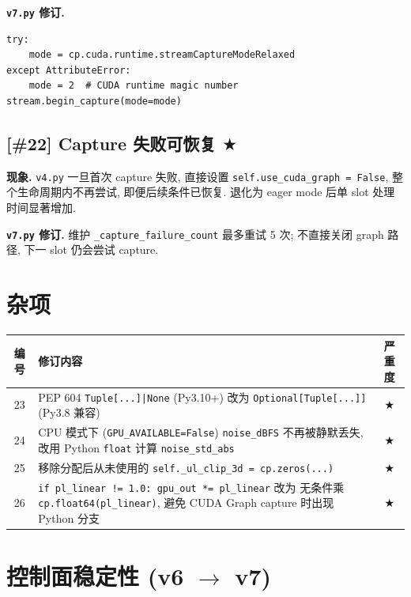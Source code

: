 \documentclass[11pt,a4paper,UTF8,fontset=fandol]{ctexart}
\newcommand{\sone}{\textcolor{starcolor}{$\bigstar$}}
\newcommand{\vfour}{\texttt{v4.py}}
\newcommand{\vseven}{\texttt{v7.py}}
\newcommand{\bugitem}[3]{%
  \subsection{[\##1] #2 \hfill #3}%
  \vspace{-0.5em}%
}
\begin{document}
\textbf{\vseven{} 修订.}
\begin{verbatim}
try:
    mode = cp.cuda.runtime.streamCaptureModeRelaxed
except AttributeError:
    mode = 2  # CUDA runtime magic number
stream.begin_capture(mode=mode)
\end{verbatim}

\bugitem{22}{Capture 失败可恢复}{\sone}

\textbf{现象.} \vfour{} 一旦首次 capture 失败, 直接设置
\texttt{self.use\_cuda\_graph = False}, 整个生命周期内不再尝试,
即便后续条件已恢复. 退化为 eager mode 后单 slot 处理时间显著增加.

\textbf{\vseven{} 修订.} 维护 \texttt{\_capture\_failure\_count}
最多重试 5 次; 不直接关闭 graph 路径, 下一 slot 仍会尝试 capture.

\section{杂项}
\label{sec:misc}

\begin{center}
\renewcommand{\arraystretch}{1.30}
\begin{tabular}{c p{8.4cm} c}
\toprule
\textbf{编号} & \textbf{修订内容} & \textbf{严重度} \\
\midrule
23 & PEP 604 \texttt{Tuple[...]|None} (Py3.10+) 改为
     \texttt{Optional[Tuple[...]]} (Py3.8 兼容) & \sone \\
24 & CPU 模式下 (\texttt{GPU\_AVAILABLE=False}) \texttt{noise\_dBFS}
     不再被静默丢失, 改用 Python \texttt{float} 计算 \texttt{noise\_std\_abs} & \sone \\
25 & 移除分配后从未使用的 \texttt{self.\_ul\_clip\_3d = cp.zeros(...)} & \sone \\
26 & \texttt{if pl\_linear != 1.0: gpu\_out *= pl\_linear} 改为
     无条件乘 \texttt{cp.float64(pl\_linear)}, 避免 CUDA Graph capture
     时出现 Python 分支 & \sone \\
\bottomrule
\end{tabular}
\end{center}

\section{控制面稳定性 (v6 $\to$ v7)}
\label{sec:control}
\end{document}
